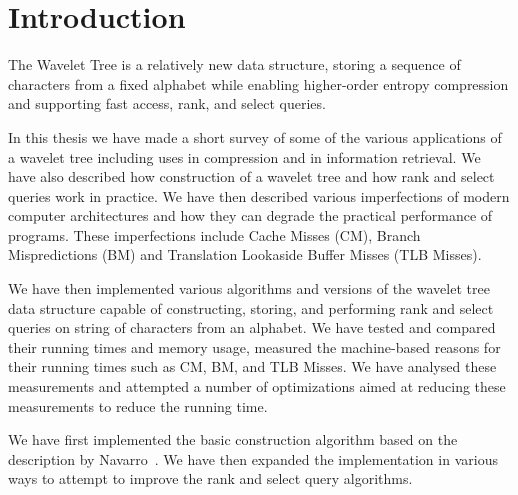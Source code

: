 \section{Introduction}
The Wavelet Tree is a relatively new data structure, storing a sequence of characters from a fixed alphabet while enabling higher-order entropy compression and supporting fast access, rank, and select queries.


In this thesis we have made a short survey of some of the various applications of a wavelet tree including uses in compression and in information retrieval.
We have also described how construction of a wavelet tree and how rank and select queries work in practice.
We have then described various imperfections of modern computer architectures and how they can degrade the practical performance of programs.
These imperfections include Cache Misses (CM), Branch Mispredictions (BM) and Translation Lookaside Buffer Misses (TLB Misses).

We have then implemented various algorithms and versions of the wavelet tree data structure capable of constructing, storing, and performing rank and select queries on string of characters from an alphabet. We have tested and compared their running times and memory usage, measured the machine-based reasons for their running times such as CM, BM, and TLB Misses. We have analysed these measurements and attempted a number of optimizations aimed at reducing these measurements to reduce the running time.

We have first implemented the basic construction algorithm based on the description by Navarro~.
We have then expanded the implementation in various ways to attempt to improve the rank and select query algorithms.

